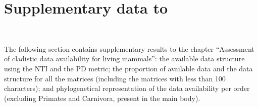 %
%

\chapter{Supplementary data to }
\label{chap:Appendix_missing_mammals}

\bigskip
\medskip
\begin{center}

 \\
\bigskip
\end{center}
%
%
The following section contains supplementary results to the chapter ``Assessment of cladistic data availability for living mammals'': the available data structure using the NTI and the PD metric; the proportion of available data and the data structure for all the matrices (including the matrices with less than 100 characters); and phylogenetical representation of the data availability per order (excluding Primates and Carnivora, present in the main body).



